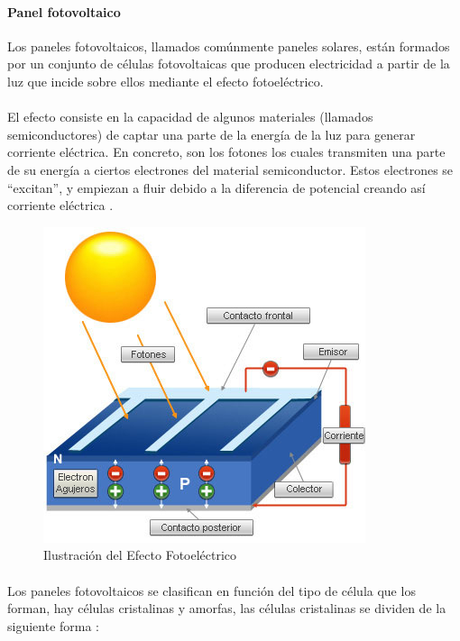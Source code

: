 \paragraph{Panel fotovoltaico}
Los paneles fotovoltaicos, llamados comúnmente paneles solares, están formados por un conjunto de células fotovoltaicas que producen electricidad a partir de la luz que incide sobre ellos mediante el efecto fotoeléctrico.
\paragraph{}
El efecto consiste en la capacidad de algunos materiales (llamados semiconductores) de captar una parte de la energía de la luz para generar corriente eléctrica. En concreto, son los fotones los cuales transmiten una parte de su energía a ciertos electrones del material semiconductor. Estos electrones se “excitan”, y empiezan a fluir debido a la diferencia de potencial creando así corriente eléctrica \citep{MarcoTeorico2}.

\begin{figure}[H]
	\centering
	\includegraphics[scale=.50]{Capitulo2/images/celula-fotovoltaica.jpg}
	\caption{Ilustración del Efecto Fotoeléctrico}
	\label{fig:diagrama_dispensador}
\end{figure}

\paragraph{}
Los paneles fotovoltaicos se clasifican en función del tipo de célula que los forman, hay células cristalinas y amorfas, las células cristalinas se dividen de la siguiente forma :

